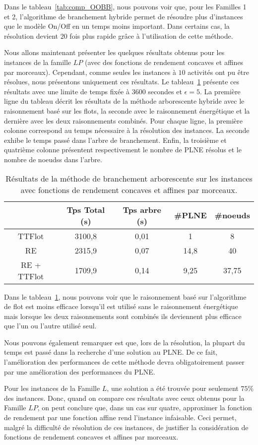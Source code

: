 Dans le tableau~\ref{tab:comp_OOBB}, nous pouvons voir que, pour les
Familles 1 et 2, l'algorithme de branchement hybride permet de
résoudre plus d'instances que le modèle On/Off en un temps moins
important. Dans certains cas, la résolution devient $20$ fois plus
rapide grâce à l'utilisation de cette méthode. 

Nous allons maintenant présenter les quelques résultats obtenus pour
les instances de la famille $LP$ (avec des fonctions de rendement
concaves et affines par morceaux). Cependant, comme seules les
instances à $10$ activités ont pu être résolues, nous présentons
uniquement ces résultats. Le tableau~\ref{tab:BB_LPM} présente
ces résultats avec une limite de temps fixée à $3600$ secondes et
$\epsilon=5$. La première ligne du tableau décrit les résultats de la
méthode arborescente hybride avec le raisonnement basé sur les flots,
la seconde avec le raisonnement énergétique et la dernière avec les
deux raisonnements combinés. Pour chaque ligne, la première colonne
correspond au temps nécessaire à la résolution des instances. La
seconde exhibe le temps passé dans l'arbre de branchement. Enfin, la
troisième et quatrième colonne présentent respectivement le nombre de
PLNE résolus et le nombre de noeudss dans l'arbre.


\begin{table}[!htb]
\centering 
\begin{tabular}{|c|cccc|}
\hline
 & Tps Total (s)  & Tps arbre (s) & \#PLNE & \#noeuds\\
\hline
TTFlot &3100,8 &0,01&	1	& 8\\
RE&2315,9&0,07&	14,8	&40\\
RE + TTFlot &1709,9&	0,14&	9,25	&37,75\\
\hline
\end{tabular}
\caption{Résultats de la méthode de branchement arborescente sur les
  instances avec fonctions de rendement concaves et affines par
  morceaux. }
\label{tab:BB_LPM}
\end{table}

Dans le tableau~\ref{tab:BB_LPM}, nous pouvons voir que le
raisonnement basé sur l'algorithme de flot est moins efficace
lorsqu'il est utilisé sans le raisonnement énergétique mais lorsque
les deux raisonnements sont combinés ils deviennent plus efficace que
l'un ou l'autre utilisé seul. 

Nous pouvons également remarquer est que, lors de la
résolution, la plupart du temps est passé dans la recherche d'une
solution au PLNE. De ce fait, l'amélioration des performances de cette
méthode devra obligatoirement passer par une amélioration des
performances du PLNE. 

Pour les instances de la Famille $L$, une solution a été trouvée pour
seulement $75\%$ des instances. Donc, quand on compare ces résultats
avec ceux obtenus pour la Famille $LP$, on peut conclure que, dans un
cas sur quatre, approximer la fonction de rendement par une fonction
affine rend l'instance infaisable. Ceci permet, malgré la difficulté
de résolution de ces instances, de justifier la considération de
fonctions de rendement concaves et affines par morceaux.




